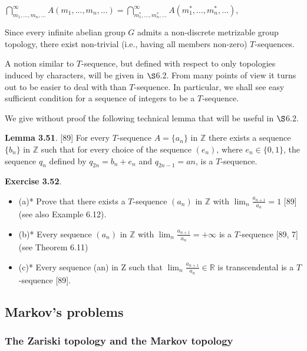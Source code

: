 \documentclass[12pt]{article}
\begin{document}
    $\bigcap^{\infty}_{m_1,...,m_n,...}A(m_1, . . . , m_n, . . .) = \bigcap^{\infty}_{m^*_1,...,m^*_n,...}A(m^*_1, . . . , m^*_n, . . .)$,


        Since every infinite abelian group $G$ admits a non-discrete metrizable group topology, there exist non-trivial
    (i.e., having all members non-zero) $T$-sequences.


        A notion similar to $T$-sequence, but defined with respect to only topologies induced by characters, will be
    given in $\S$6.2. From many points of view it turns out to be easier to deal with than $T$-sequence. In particular,
    we shall see easy sufficient condition for a sequence of integers to be a $T$-sequence.

    
        We give without proof the following technical lemma that will be useful in $\S$6.2.


    \textbf{Lemma 3.51}. [89] For every $T$-sequence $A = \{a_n\}$ in $\mathbb{Z}$ there exists a sequence $\{b_n\}$ in $\mathbb{Z}$ such that for every
    choice of the sequence $(e_n)$, where $e_n \in \{0, 1\}$, the sequence $q_n$ defined by $q_{2n} = b_n + e_n$ and $q_{2n-1} = an$, is a
    $T$-sequence.


    \textbf{Exercise 3.52}. \begin{itemize}

        \item (a)* Prove that there exists a $T$-sequence $(a_n)$ in $\mathbb{Z}$ with $\lim_n \frac{a_{n+1}}{a_n} = 1$ [89] (see also Example
        6.12).

        \item (b)* Every sequence $(a_n)$ in $\mathbb{Z}$ with $\lim_n \frac{a_{n+1}}{a_n} = +\infty$ is a $T$-sequence [89, 7] (see Theorem 6.11)

        \item (c)* Every sequence (an) in Z such that $\lim_n \frac{a_{n+1}}{a_n} \in \mathbb{R}$ is transcendental is a $T$-sequence [89].

    \end{itemize}


    \subsection{Markov's problems}


    \subsubsection{The Zariski topology and the Markov topology}
\end{document}
